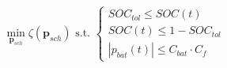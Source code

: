 \begin{equation}
	\min_{\textbf{p}_{sch}}\zeta(\textbf{p}_{sch})
	\text{ s.t. }
	\begin{cases}
		SOC_{tol} \leq SOC(t)\\
		SOC(t) \leq 1-SOC_{tol}\\
		|p_{bat}(t)| \leq C_{bat} \cdot C_{f}
	\end{cases}
\label{ch2:equ:cost-minimisation}
\end{equation}